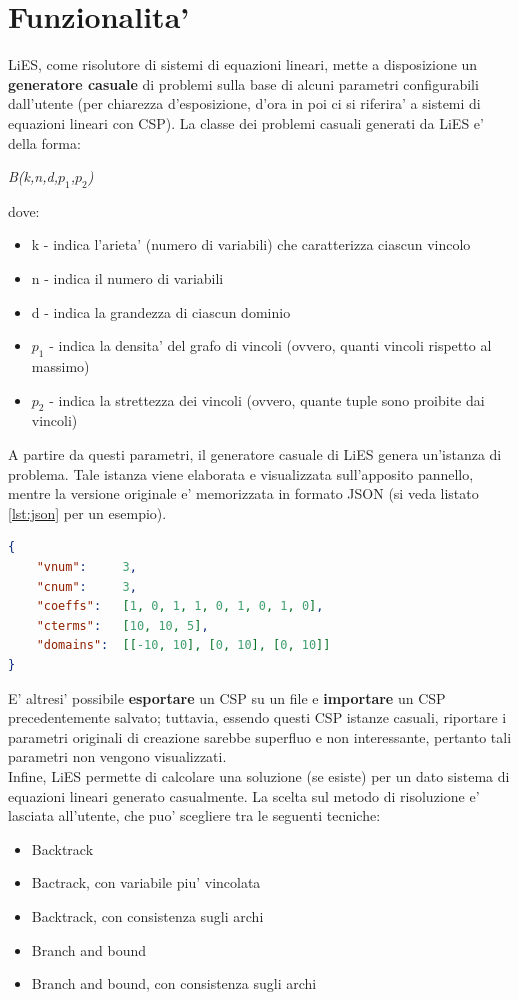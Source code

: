 \documentclass[10pt, a4paper]{article}
\begin{document}
\section{Funzionalita'}
\label{sec:funzionalita}

LiES, come risolutore di sistemi di equazioni lineari, mette a disposizione un \textbf{generatore casuale} di problemi sulla base di alcuni parametri configurabili dall'utente (per chiarezza d'esposizione, d'ora in poi ci si riferira' a sistemi di equazioni lineari con CSP). La classe dei problemi casuali generati da LiES e' della forma:
\begin{center}
	\textit{B(k,n,d,$p_1$,$p_2$)}
\end{center}

dove:
\begin{itemize}
	\item k - indica l'arieta' (numero di variabili) che caratterizza ciascun vincolo
	\item n - indica il numero di variabili
	\item d - indica la grandezza di ciascun dominio
	\item $p_1$ - indica la densita' del grafo di vincoli (ovvero, quanti vincoli rispetto al massimo)
	\item $p_2$ - indica la strettezza dei vincoli (ovvero,	quante tuple sono proibite dai vincoli) 
\end{itemize}

A partire da questi parametri, il generatore casuale di LiES genera un'istanza di problema. Tale istanza viene elaborata e visualizzata sull'apposito pannello, mentre la versione originale e' memorizzata in formato JSON (si veda listato \ref{lst:json} per un esempio).

\begin{lstlisting}[language=json, caption=Rappresentazione in formato json di un sistema di equazioni lineari, label=lst:json]
{
	"vnum": 	3,
	"cnum":		3,
	"coeffs": 	[1, 0, 1, 1, 0, 1, 0, 1, 0],
	"cterms":	[10, 10, 5],
	"domains":	[[-10, 10], [0, 10], [0, 10]]
}
\end{lstlisting}


E' altresi' possibile \textbf{esportare} un CSP su un file e \textbf{importare} un CSP precedentemente salvato; tuttavia, essendo questi CSP istanze casuali, riportare i parametri originali di creazione sarebbe superfluo e non interessante, pertanto tali parametri non vengono visualizzati.\\

Infine, LiES permette di calcolare una soluzione (se esiste) per un dato sistema di equazioni lineari generato casualmente. La scelta sul metodo di risoluzione e' lasciata all'utente, che puo' scegliere tra le seguenti tecniche:
\begin{itemize}
	\item Backtrack
	\item Bactrack, con variabile piu' vincolata
	\item Backtrack, con consistenza sugli archi
	\item Branch and bound
	\item Branch and bound, con consistenza sugli archi
\end{itemize}
\end{document}
